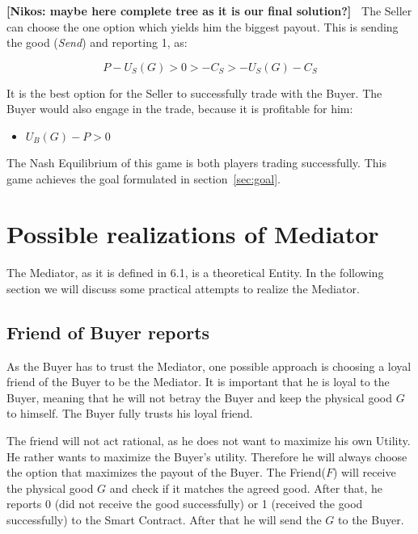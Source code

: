 \documentclass{cacthesis}
\newcommand{\authnote}[3]{{ \footnotesize \textbf{#1[#2: #3]~}}}
\newcommand{\orfnote}[1]{\authnote{\color{blue}}{Orfeas}{#1}}
\newcommand{\niknote}[1]{\authnote{\color{red}}{Nikos}{#1}}
\begin{document}
\niknote{maybe here complete tree as it is our final solution?}
The Seller can choose the one option which yields him the biggest payout. This is sending the good (\emph{Send}) and reporting 1, as: 

\[P-U_S(G)>0>-C_S>-U_S(G) - C_S\]

It is the best option for the Seller to successfully trade with the Buyer.
The Buyer would also engage in the trade, because it is profitable for him:
\begin{itemize}
    \item $U_B(G) -P > 0$
\end{itemize}
The Nash Equilibrium of this game is both players trading successfully. This game achieves the goal formulated in section~\ref{sec:goal}.

\section{Possible realizations of Mediator}
The Mediator, as it is defined in 6.1, is a theoretical Entity. In the following section we will discuss some practical attempts to realize the Mediator.
\subsection{Friend of Buyer reports}
As the Buyer has to trust the Mediator, one possible approach is choosing a loyal friend of the Buyer to be the Mediator. It is important that he is loyal to the Buyer, meaning that he will not betray the Buyer and keep the physical good $G$ to himself. The Buyer fully trusts his loyal friend.\newline

The friend will not act rational, as he does not want to maximize his own Utility. He rather wants to maximize the Buyer's utility. Therefore he will always choose the option that maximizes the payout of the Buyer.
The Friend($F$) will receive the physical good $G$ and check if it matches the agreed good. After that, he reports 0 (did not receive the good successfully) or 1 (received the good successfully) to the Smart Contract. After that he will send the $G$ to the Buyer.\newpage
\end{document}
